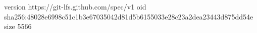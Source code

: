 version https://git-lfs.github.com/spec/v1
oid sha256:48028e6998c51c1b3e67035042d81d5b6155033e28c23a2dea23443d875dd54e
size 5566
